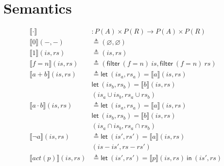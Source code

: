 \documentclass[12pt, letterpaper]{article}
\let\emptyset\varnothing
\begin{document}
\section*{Semantics}
	\begin{align*}
		\llbracket \cdot \rrbracket 
		& : P(A)\times P(R) \rightarrow P(A)\times P(R) \\
		\llbracket 0 \rrbracket(-, -)
			& \triangleq
			(\emptyset , \emptyset)
			\\ %
		\llbracket 1 \rrbracket(\mathit{is}, \mathit{rs})
			& \triangleq 
			(\mathit{is}, \mathit{rs})
		\\
		\llbracket f=n \rrbracket(\mathit{is}, \mathit{rs})
		& \triangleq
                (\mathsf{filter}\ (f=n)\ \mathit{is},
                \mathsf{filter}\ (f=n)\ \mathit{rs}) \\
		\llbracket a + b \rrbracket(\mathit{is}, \mathit{rs})
		& \triangleq
                \mathsf{let}\ (\mathit{is}_a,\mathit{rs}_a) = \llbracket a \rrbracket(\mathit{is}, \mathit{rs}) \\
                &\mathsf{let}\ (\mathit{is}_b,\mathit{rs}_b) =
                \llbracket b \rrbracket(\mathit{is}, \mathit{rs}) \\
                &(\mathit{is}_a \cup \mathit{is}_b,\mathit{rs}_a \cup \mathit{rs}_b) \\
		\llbracket a \cdot b \rrbracket(\mathit{is}, \mathit{rs})
		& \triangleq
                \mathsf{let}\ (\mathit{is}_a,\mathit{rs}_a) = \llbracket a \rrbracket(\mathit{is}, \mathit{rs}) \\
                &\mathsf{let}\ (\mathit{is}_b,\mathit{rs}_b) =
                \llbracket b \rrbracket(\mathit{is}, \mathit{rs}) \\
                &(\mathit{is}_a \cap \mathit{is}_b,\mathit{rs}_a \cap \mathit{rs}_b) \\
		\llbracket \neg a \rrbracket(\mathit{is}, \mathit{rs})
		& \triangleq
                \mathsf{let}\ (\mathit{is}',\mathit{rs}') = \llbracket a \rrbracket(\mathit{is}, \mathit{rs}) \\
                &(\mathit{is} - \mathit{is}',\mathit{rs} - \mathit{rs}') \\
		\llbracket act(p) \rrbracket(\mathit{is}, \mathit{rs})
			& \triangleq
		\mathsf{let}\ (\mathit{is}',\mathit{rs}')
                = \llbracket p\rrbracket(\mathit{is}, \mathit{rs})\ 
                \mathsf{in}\ (\mathit{is}',\mathit{rs})

\end{align*}
\end{document}

